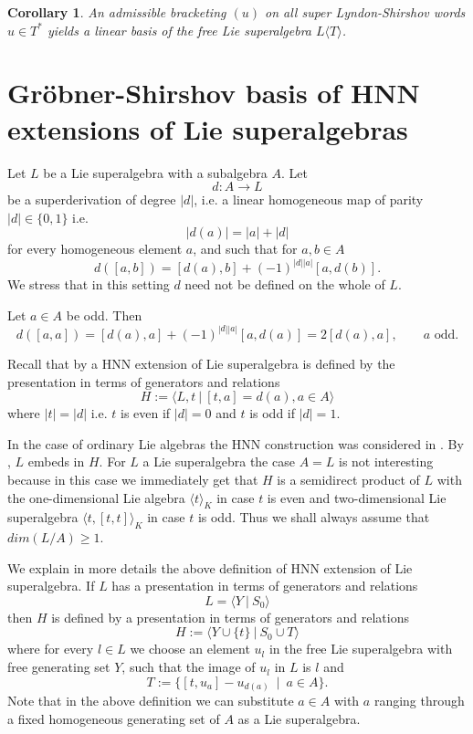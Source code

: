 \documentclass[12pt, reqno]{amsart}
\newtheorem{cor}[theorem]{Corollary}
\theoremstyle{remark}
\theoremstyle{definition}
\numberwithin{equation}{section}
\begin{document}
\begin{cor}
An admissible bracketing $(u)$ on all super Lyndon-Shirshov words $u\in T^*$  yields a linear basis of the free Lie superalgebra $L\langle T\rangle$. 
\end{cor}




\section{ Gr\"obner-Shirshov basis of HNN extensions of Lie superalgebras }
Let $L$ be a Lie superalgebra   with a subalgebra $A$. Let $$d : A \to L$$ be a 
superderivation of degree $|d|$, i.e. a linear homogeneous map of parity $|d|\in \{0,1\}$  i.e.
$$ |d(a) | = | a | + | d |$$ for every homogeneous element $a$, and
such that for $a, b \in A$
$$d([a,b]) = [d(a), b] + (-1)^{|d| |a|} [a, d(b)].$$
We stress that in this setting $d$ need not be defined on the whole of $L$.

Let $a\in A$ be odd. Then 
\begin{equation}\label{der2}
d([a,a])=[d(a), a]+(-1)^{|d||a|}[a,d(a)]=2[d(a),a],\qquad a \text{ odd}.
\end{equation}


Recall that  by \cite{L-P-Z} a HNN extension of Lie superalgebra is  defined by the presentation in terms of generators and relations
 \begin{equation} \label{eq-HNN} H  :=  \langle L, t \ | \ [t,a] = d(a), a \in A \rangle \end{equation}  
where $| t | = | d |$ i.e. $t$ is even if $|d| = 0$ and $t$ is odd if $|d| = 1$.
 
 In the case of ordinary Lie algebras the HNN construction was considered 
  in \cite{W,L-S}. By \cite{L-P-Z}, $L$ embeds in $H$.
For $L$ a Lie superalgebra the case $A=L$ is not interesting because in this case we immediately get that $H$ is a semidirect product of $L$ with the one-dimensional Lie algebra $\langle t\rangle_K$ in case $t$ is even and two-dimensional Lie superalgebra $\langle t,[t,t]\rangle_K$ in  case $t$ is odd.
 Thus we shall always assume that $dim(L/A)\ge 1$.
 

 We explain in more details the above definition of HNN extension of Lie superalgebra. If $L$ has a presentation in terms of generators and relations
 $$L = \langle Y \ | \ S_0 \rangle$$
 then $H$ is  defined by a presentation in terms of generators and relations
 $$H := \langle Y \cup \{ t \} \ | \ S_0 \cup T \rangle$$
 where for every $l \in L$ we choose an element $u_l$ in the free Lie superalgebra with 
  free generating set $Y$, such that the image of $u_l$ in $L$ is $l$ and 
 $$T := \{ [t, u_a] - u_{d(a)}\  \mid\ a \in A \}.$$
 Note that in the above definition we  can substitute $a \in A$ with $a$  ranging through a fixed  homogeneous generating set of $A$ as a Lie superalgebra.
\end{document}
